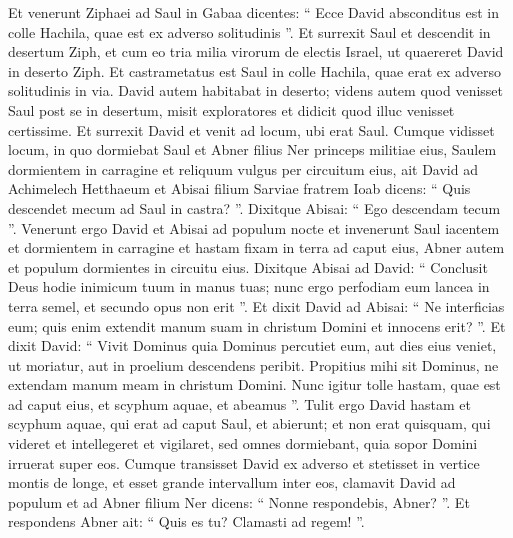 \begin{biblechapter}
\begin{biblechapter}
\begin{biblechapter}
\begin{biblechapter}
\begin{biblechapter}
\begin{biblechapter}
\begin{biblechapter}
\begin{biblechapter}
\begin{biblechapter}
\begin{biblechapter}
\begin{biblechapter}
\begin{biblechapter}
\begin{biblechapter}
\begin{biblechapter}
\begin{biblechapter}
\begin{biblechapter}
\begin{biblechapter}
\begin{biblechapter}
\begin{biblechapter}
\begin{biblechapter}
\begin{biblechapter}
\begin{biblechapter}
\begin{biblechapter}
\begin{biblechapter}
\begin{biblechapter}
\begin{biblechapter}
\verse Et venerunt Ziphaei ad Saul in Gabaa dicentes: “ Ecce David absconditus est in colle Hachila, quae est ex adverso solitudinis ”. 
\verse Et surrexit Saul et descendit in desertum Ziph, et cum eo tria milia virorum de electis Israel, ut quaereret David in deserto Ziph. 
\verse Et castrametatus est Saul in colle Hachila, quae erat ex adverso solitudinis in via. David autem habitabat in deserto; videns autem quod venisset Saul post se in desertum, 
\verse misit exploratores et didicit quod illuc venisset certissime. 
\verse Et surrexit David et venit ad locum, ubi erat Saul. Cumque vidisset locum, in quo dormiebat Saul et Abner filius Ner princeps militiae eius, Saulem dormientem in carragine et reliquum vulgus per circuitum eius, 
\verse ait David ad Achimelech Hetthaeum et Abisai filium Sarviae fratrem Ioab dicens: “ Quis descendet mecum ad Saul in castra? ”. Dixitque Abisai: “ Ego descendam tecum ”.
 \verse Venerunt ergo David et Abisai ad populum nocte et invenerunt Saul iacentem et dormientem in carragine et hastam fixam in terra ad caput eius, Abner autem et populum dormientes in circuitu eius. 
\verse Dixitque Abisai ad David: “ Conclusit Deus hodie inimicum tuum in manus tuas; nunc ergo perfodiam eum lancea in terra semel, et secundo opus non erit ”. 
\verse Et dixit David ad Abisai: “ Ne interficias eum; quis enim extendit manum suam in christum Domini et innocens erit? ”. 
\verse Et dixit David: “ Vivit Dominus quia Dominus percutiet eum, aut dies eius veniet, ut moriatur, aut in proelium descendens peribit. 
\verse Propitius mihi sit Dominus, ne extendam manum meam in christum Domini. Nunc igitur tolle hastam, quae est ad caput eius, et scyphum aquae, et abeamus ”. 
 \verse Tulit ergo David hastam et scyphum aquae, qui erat ad caput Saul, et abierunt; et non erat quisquam, qui videret et intellegeret et vigilaret, sed omnes dormiebant, quia sopor Domini irruerat super eos.
 \verse Cumque transisset David ex adverso et stetisset in vertice montis de longe, et esset grande intervallum inter eos, 
\verse clamavit David ad populum et ad Abner filium Ner dicens: “ Nonne respondebis, Abner? ”. Et respondens Abner ait: “ Quis es tu? Clamasti ad regem! ”. 

\end{biblechapter}
\end{biblechapter}
\end{biblechapter}
\end{biblechapter}
\end{biblechapter}
\end{biblechapter}
\end{biblechapter}
\end{biblechapter}
\end{biblechapter}
\end{biblechapter}
\end{biblechapter}
\end{biblechapter}
\end{biblechapter}
\end{biblechapter}
\end{biblechapter}
\end{biblechapter}
\end{biblechapter}
\end{biblechapter}
\end{biblechapter}
\end{biblechapter}
\end{biblechapter}
\end{biblechapter}
\end{biblechapter}
\end{biblechapter}
\end{biblechapter}
\end{biblechapter}

